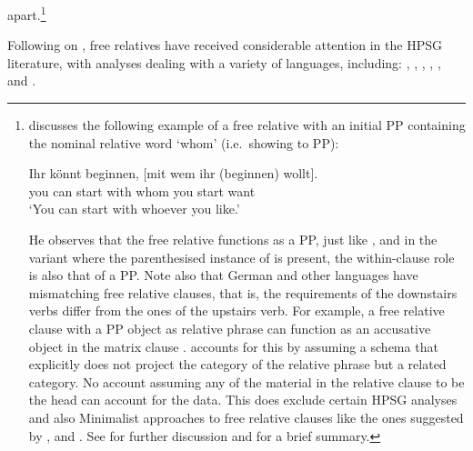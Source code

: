 \documentclass[output=paper
 	        ,biblatex
                ,babelshorthands
                ,newtxmath
                ,draftmode
                ,colorlinks, citecolor=brown
]{langscibook}
\begin{document}
apart.\footnote{\label{fn:rc-5}\citet[90]{Mueller99b} discusses the following  example
  of a free relative with an initial PP containing the nominal relative word 
  `whom' (i.e.\ showing  to PP):
  \begin{exe}\ex\label{x:rc-157}
    \gll Ihr könnt beginnen, [mit wem ihr (beginnen) wollt].\\
         you can   start     \spacebr{}with whom you \hphantom{(}start want\\
    \glt `You can start with whoever you like.’
  \end{exe}
  He observes that the free relative functions as a PP, just like , and in
  the variant where the parenthesised instance of  is present, the within-clause
  role is also that of a PP. Note also that German and other languages have mismatching free
    relative clauses, that is, the requirements of the downstairs verbs differ from the ones of the
    upstairs verb. For example, a free relative clause with a PP object as relative phrase can
    function as an accusative object in the matrix clause \parencites[]{Bausewein90}[]{Mueller99b}. \citet[]{Mueller99b} accounts for this by assuming a schema that explicitly does not project
    the category of the relative phrase but a related category. No account assuming any of the
    material in the relative clause to be the head can account for the data. This does exclude
    certain HPSG analyses and also Minimalist approaches to free relative clauses like the ones
    suggested by \citet{Donati2006a-u}, \citet{Ott2011a} and \citet{Chomsky2008a,Chomsky2013a}. See
     for further discussion and 
    for a brief summary.
}



Following \citet{Mueller99b} on , free relatives have received considerable
attention in the HPSG literature, with analyses dealing with a variety of languages,
including:  \citep{Alqurashi:12,Hahn:12},  \citep{Bjerre:12,Bjerre:14},
\citep{kim-park1996english,Kim01Constructional,WK03a,Francis07,Yoo:08,KimMixed2017},
 \citep{Hinrichs:Nakazawa:02,Kubota:03},  \citep{Taghvaipour:05}, and 
\citep{Borsley:08}.
\end{document}
